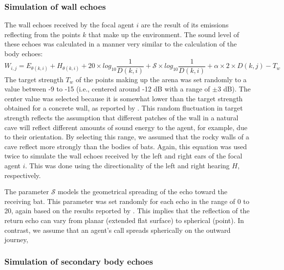 \documentclass[a4paper, 11pt]{article}
\newcommand{\direction}{\theta}
\newcommand{\emission}{E}
\newcommand{\hearing}{H}
\newcommand{\distance}{D}
\newcommand{\targetstrength}{T}
\newcommand{\wrt}[2]{#1,#2}
\newcommand{\spreading}{\mathcal{S}}
\begin{document}
\subsubsection{Simulation of wall echoes}

The wall echoes received by the focal agent $i$ are the result of its emissions reflecting from the points $k$ that make up the environment. The sound level of these echoes was calculated in a manner very similar to the calculation of the body echoes:
%
\begin{equation}
W_{i,j} = \emission_{\direction(\wrt{k}{i})} + \hearing_{\direction(\wrt{k}{i})} + 20 \times log_{10}\frac{1}{\distance(k,i)} + \spreading \times log_{10}\frac{1}{\distance(k,i)} + \alpha \times 2 \times \distance(k,j) - \targetstrength_w
\label{eq:walls}
\end{equation}
%
The target strength $\targetstrength_w$ of the points making up the arena was set randomly to a value between -9 to -15 (i.e., centered around -12 dB with a range of $\pm$3 dB). The center value was selected because it is somewhat lower than the target strength obtained for a concrete wall, as reported by \citet{Stilz2012}. This random fluctuation in target strength reflects the assumption that different patches of the wall in a natural cave will reflect different amounts of sound energy to the agent, for example, due to their orientation. By selecting this range, we assumed that the rocky walls of a cave reflect more strongly than the bodies of bats. Again, this equation was used twice to simulate the wall echoes received by the left and right ears of the focal agent $i$. This was done using the directionality of the left and right hearing $\hearing$, respectively. 

The parameter $\spreading$ models the geometrical spreading of the echo toward the receiving bat. This parameter was set randomly for each echo in the range of 0 to 20, again based on the results reported by \citet{Stilz2012}. This implies that the reflection of the return echo can vary from planar (extended flat surface) to spherical (point). In contrast, we assume that an agent's call spreads spherically on the outward journey, 

\subsubsection{Simulation of secondary body echoes}
\end{document}
